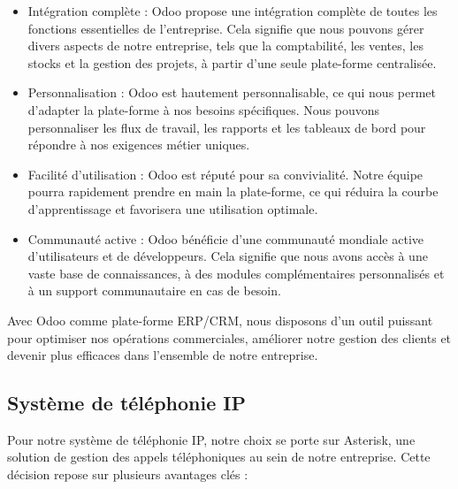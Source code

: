 \begin{itemize}

\item Intégration complète : Odoo propose une intégration complète de toutes les fonctions essentielles de l'entreprise. Cela signifie que nous pouvons gérer divers aspects de notre entreprise, tels que la comptabilité, les ventes, les stocks et la gestion des projets, à partir d'une seule plate-forme centralisée.

\item Personnalisation : Odoo est hautement personnalisable, ce qui nous permet d'adapter la plate-forme à nos besoins spécifiques. Nous pouvons personnaliser les flux de travail, les rapports et les tableaux de bord pour répondre à nos exigences métier uniques.

\item Facilité d'utilisation : Odoo est réputé pour sa convivialité. Notre équipe pourra rapidement prendre en main la plate-forme, ce qui réduira la courbe d'apprentissage et favorisera une utilisation optimale.

\item Communauté active : Odoo bénéficie d'une communauté mondiale active d'utilisateurs et de développeurs. Cela signifie que nous avons accès à une vaste base de connaissances, à des modules complémentaires personnalisés et à un support communautaire en cas de besoin.

\end{itemize}

Avec Odoo comme plate-forme ERP/CRM, nous disposons d'un outil puissant pour optimiser nos opérations commerciales, améliorer notre gestion des clients et devenir plus efficaces dans l'ensemble de notre entreprise.



\subsection{Système de téléphonie IP}

Pour notre système de téléphonie IP, notre choix se porte sur Asterisk, une solution de gestion des appels téléphoniques au sein de notre entreprise. Cette décision repose sur plusieurs avantages clés :

